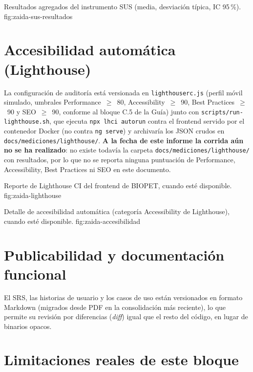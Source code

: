%
{Resultados agregados del instrumento SUS (media, desviaci\'on t\'ipica, IC 95\,\%).}%
{fig:zaida-sus-resultados}

\section{Accesibilidad autom\'atica (Lighthouse)}
\label{sec:zaida-lighthouse}

La configuraci\'on de auditor\'ia est\'a versionada en
\texttt{lighthouserc.js} (perfil m\'ovil simulado, umbrales
Performance~$\geq$~80, Accessibility~$\geq$~90, Best Practices~$\geq$~90 y
SEO~$\geq$~90, conforme al bloque C.5 de la Gu\'ia) junto con
\texttt{scripts/run-lighthouse.sh}, que ejecuta \texttt{npx lhci autorun}
contra el frontend servido por el contenedor Docker (no contra
\texttt{ng serve}) y archivar\'ia los JSON crudos en
\texttt{docs/mediciones/lighthouse/}. \textbf{A la fecha de este informe la
corrida a\'un no se ha realizado}: no existe todav\'ia la carpeta
\texttt{docs/mediciones/lighthouse/} con resultados, por lo que no se
reporta ninguna puntuaci\'on de Performance, Accessibility, Best Practices
ni SEO en este documento.

%
{Reporte de Lighthouse CI del frontend de BIOPET, cuando est\'e disponible.}%
{fig:zaida-lighthouse}

%
{Detalle de accesibilidad autom\'atica (categor\'ia Accessibility de Lighthouse), cuando est\'e disponible.}%
{fig:zaida-accesibilidad}

\section{Publicabilidad y documentaci\'on funcional}

El SRS, las historias de usuario y los casos de uso est\'an versionados en
formato Markdown (migrados desde PDF en la consolidaci\'on m\'as reciente),
lo que permite su revisi\'on por diferencias (\emph{diff}) igual que el
resto del c\'odigo, en lugar de binarios opacos.

\section{Limitaciones reales de este bloque}

